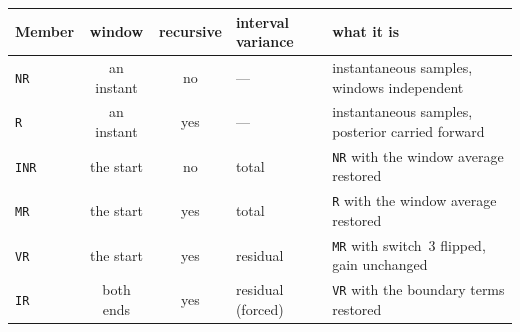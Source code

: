 \begin{appendixbox}
\begin{center}
\begin{tabularx}{\linewidth}{@{}lccl>{\raggedright\arraybackslash}X@{}}
\toprule
Member & window & recursive & interval variance & what it is \\
\midrule
\texttt{NR}  & an instant & no  & --- & instantaneous samples, windows independent \\
\texttt{R}   & an instant & yes & --- & instantaneous samples, posterior carried forward \\
\texttt{INR} & the start & no  & total & \texttt{NR} with the window average restored \\
\texttt{MR}  & the start & yes & total & \texttt{R} with the window average restored \\
\texttt{VR}  & the start & yes & residual & \texttt{MR} with switch~3 flipped, gain unchanged \\
\texttt{IR}  & both ends & yes & residual (forced) & \texttt{VR} with the boundary terms restored \\
\bottomrule
\end{tabularx}
\label{tab:appendix-members}
\end{center}


\end{appendixbox}
